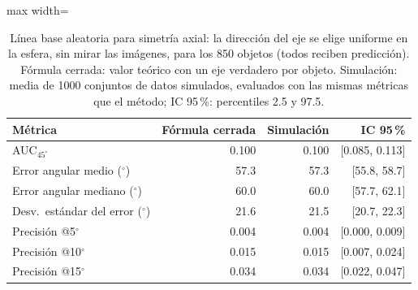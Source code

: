
\begin{table}[htbp]
\centering
\caption{Línea base aleatoria para simetría axial: la dirección del eje se elige uniforme en la esfera, sin mirar las imágenes, para los 850 objetos (todos reciben predicción). Fórmula cerrada: valor teórico con un eje verdadero por objeto. Simulación: media de 1000 conjuntos de datos simulados, evaluados con las mismas métricas que el método; IC 95\,\%: percentiles 2.5 y 97.5.}
\label{tab:axis_azar}
\begin{adjustbox}{max width=\textwidth}
\begin{tabular}{lrrr}
\toprule
Métrica & Fórmula cerrada & Simulación & IC 95\,\% \\
\midrule
AUC$_{45^\circ}$ & 0.100 & 0.100 & [0.085, 0.113] \\
Error angular medio ($^\circ$) & 57.3 & 57.3 & [55.8, 58.7] \\
Error angular mediano ($^\circ$) & 60.0 & 60.0 & [57.7, 62.1] \\
Desv.\ estándar del error ($^\circ$) & 21.6 & 21.5 & [20.7, 22.3] \\
Precisión @5$^\circ$ & 0.004 & 0.004 & [0.000, 0.009] \\
Precisión @10$^\circ$ & 0.015 & 0.015 & [0.007, 0.024] \\
Precisión @15$^\circ$ & 0.034 & 0.034 & [0.022, 0.047] \\
\bottomrule
\end{tabular}
\end{adjustbox}
\end{table}
